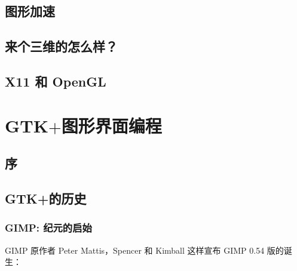 \documentclass[cm-default,no-math,SlantFont,CJKnumber,a4papper,oneside]{ctexbook}
\begin{document}
\chapter{图形加速}

\chapter{来个三维的怎么样？}

\chapter{X11 和 OpenGL }

\part{GTK$+$图形界面编程}

\chapter{序}

\chapter{GTK+的历史}




\section{GIMP: 纪元的启始}

GIMP 原作者 Peter Mattis，Spencer 和 Kimball 这样宣布 GIMP 0.54 版的诞生： 
\end{document}
